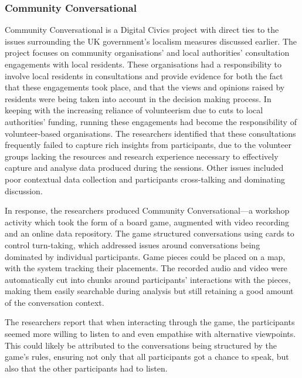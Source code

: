 \subsubsection{Community Conversational}

Community Conversational \citep{Johnson2017} is a Digital Civics project with direct ties to the issues surrounding the UK government's localism measures discussed earlier. The project focuses on community organisations' and local authorities' consultation engagements with local residents. These organisations had a responsibility to involve local residents in consultations and provide evidence for both the fact that these engagements took place, and that the views and opinions raised by residents were being taken into account in the decision making process. In keeping with the increasing reliance of volunteerism due to cuts to local authorities' funding, running these engagements had become the responsibility of volunteer-based organisations. The researchers identified that these consultations frequently failed to capture rich insights from participants, due to the volunteer groups lacking the resources and research experience necessary to effectively capture and analyse data produced during the sessions. Other issues included poor contextual data collection and participants cross-talking and dominating discussion. 

In response, the researchers produced Community Conversational---a workshop activity which took the form of a board game, augmented with video recording and an online data repository. The game structured conversations using cards to control turn-taking, which addressed issues around conversations being dominated by individual participants. Game pieces could be placed on a map, with the system tracking their placements. The recorded audio and video were automatically cut into chunks around participants' interactions with the pieces, making them easily searchable during analysis but still retaining a good amount of the conversation context.

The researchers report that when interacting through the game, the participants seemed more willing to listen to and even empathise with alternative viewpoints. This could likely be attributed to the conversations being structured by the game's rules, ensuring not only that all participants got a chance to speak, but also that the other participants had to listen.

